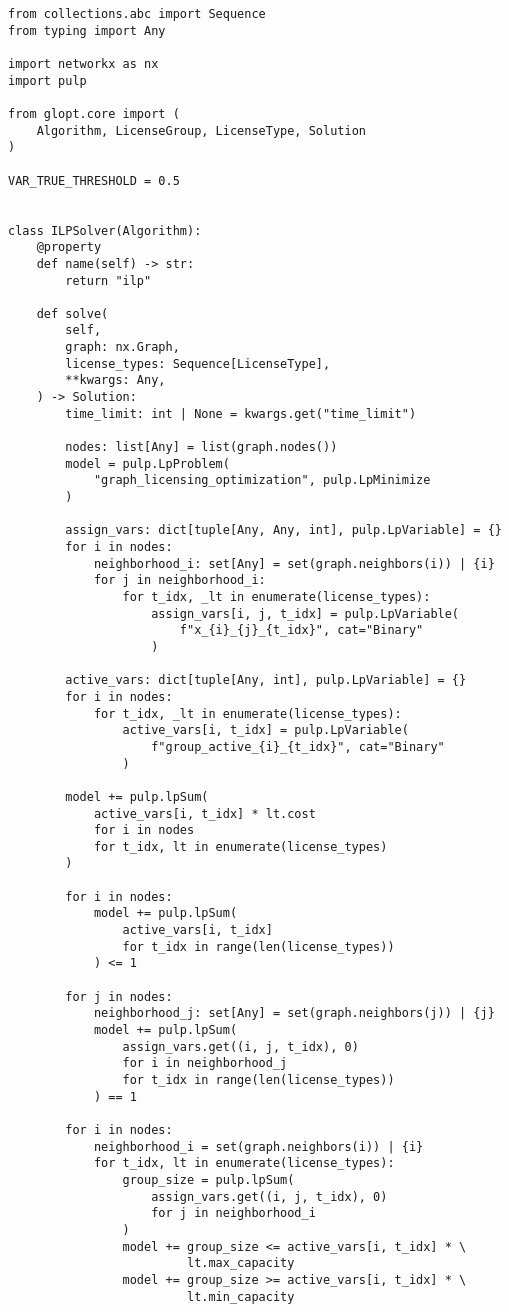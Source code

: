 \begin{verbatim}
from collections.abc import Sequence
from typing import Any

import networkx as nx
import pulp

from glopt.core import (
    Algorithm, LicenseGroup, LicenseType, Solution
)

VAR_TRUE_THRESHOLD = 0.5


class ILPSolver(Algorithm):
    @property
    def name(self) -> str:
        return "ilp"

    def solve(
        self,
        graph: nx.Graph,
        license_types: Sequence[LicenseType],
        **kwargs: Any,
    ) -> Solution:
        time_limit: int | None = kwargs.get("time_limit")

        nodes: list[Any] = list(graph.nodes())
        model = pulp.LpProblem(
            "graph_licensing_optimization", pulp.LpMinimize
        )

        assign_vars: dict[tuple[Any, Any, int], pulp.LpVariable] = {}
        for i in nodes:
            neighborhood_i: set[Any] = set(graph.neighbors(i)) | {i}
            for j in neighborhood_i:
                for t_idx, _lt in enumerate(license_types):
                    assign_vars[i, j, t_idx] = pulp.LpVariable(
                        f"x_{i}_{j}_{t_idx}", cat="Binary"
                    )

        active_vars: dict[tuple[Any, int], pulp.LpVariable] = {}
        for i in nodes:
            for t_idx, _lt in enumerate(license_types):
                active_vars[i, t_idx] = pulp.LpVariable(
                    f"group_active_{i}_{t_idx}", cat="Binary"
                )

        model += pulp.lpSum(
            active_vars[i, t_idx] * lt.cost
            for i in nodes
            for t_idx, lt in enumerate(license_types)
        )

        for i in nodes:
            model += pulp.lpSum(
                active_vars[i, t_idx]
                for t_idx in range(len(license_types))
            ) <= 1

        for j in nodes:
            neighborhood_j: set[Any] = set(graph.neighbors(j)) | {j}
            model += pulp.lpSum(
                assign_vars.get((i, j, t_idx), 0)
                for i in neighborhood_j
                for t_idx in range(len(license_types))
            ) == 1

        for i in nodes:
            neighborhood_i = set(graph.neighbors(i)) | {i}
            for t_idx, lt in enumerate(license_types):
                group_size = pulp.lpSum(
                    assign_vars.get((i, j, t_idx), 0)
                    for j in neighborhood_i
                )
                model += group_size <= active_vars[i, t_idx] * \
                         lt.max_capacity
                model += group_size >= active_vars[i, t_idx] * \
                         lt.min_capacity


\end{verbatim}
